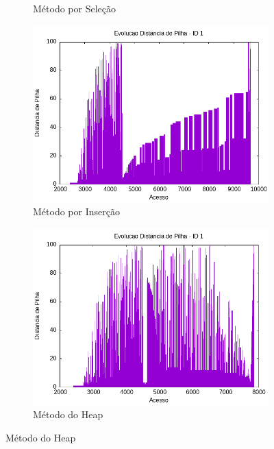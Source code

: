 \documentclass{article}
\begin{document}
\begin{figure}[H]
\begin{subfigure}[c]{0.4\textwidth}
        \caption{Método por Seleção}
        \label{fig:ac06}
    \end{subfigure}
    \hfill
    \begin{subfigure}[c]{0.4\textwidth}
        \centering
        \includegraphics[width=\textwidth]{./images/100-200/inserctionsort/registro_a-distp-1.png}
        \caption{Método por Inserção}
        \label{fig:ac07}
    \end{subfigure}
    \hfill
    \begin{subfigure}[c]{0.4\textwidth}
        \centering
        \includegraphics[width=\textwidth]{./images/100-200/heapsort/registro_a-distp-1.png}
        \caption{Método do Heap}
        \label{fig:ac08}
    \end{subfigure}

\end{figure}
\end{document}
